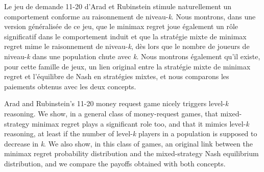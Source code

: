 

\begin{Article}[Titre=Minimax regret et jeu de demande 11-20,
Auteur={Gisèle Umbhauer\thanks{BETA, Université de Strasbourg. \emph{Correspondance:}
61 avenue de la Forêt Noire, 67085 Strasbourg Cedex, France. \emph{Courriel:} \href{mailto:umbhauer@unistra.fr}{umbhauer@unistra.fr}}}]

\label{UmbhauerFR}


\begin{resume}
Le jeu de demande 11-20 d'Arad et Rubinstein stimule naturellement un
comportement conforme au raisonnement de niveau-\emph{k}. Nous montrons,
dans une version généralisée de ce jeu, que le minimax regret joue
également un rôle significatif dans le comportement induit et que la
stratégie mixte de minimax regret mime le raisonnement de
niveau-\emph{k}, dès lors que le nombre de joueurs de niveau-\emph{k}
dans une population chute avec \emph{k}. Nous montrons également qu'il
existe, pour cette famille de jeux, un lien original entre la stratégie
mixte de minimax regret et l'équilibre de Nash en stratégies mixtes, et
nous comparons les paiements obtenus avec les deux concepts.    
\end{resume}


\begin{resumeENG}
Arad and Rubinstein's 11-20 money request game nicely triggers
level-\emph{k} reasoning. We show, in a general class of money-request
games, that mixed-strategy minimax regret plays a significant role too,
and that it mimics level-\emph{k} reasoning, at least if the number of
level-\emph{k} players in a population is supposed to decrease in
\emph{k}. We also show, in this class of games, an original link between
the minimax regret probability distribution and the mixed-strategy Nash
equilibrium distribution, and we compare the payoffs obtained with both
concepts.
\end{resumeENG}


\end{Article}
